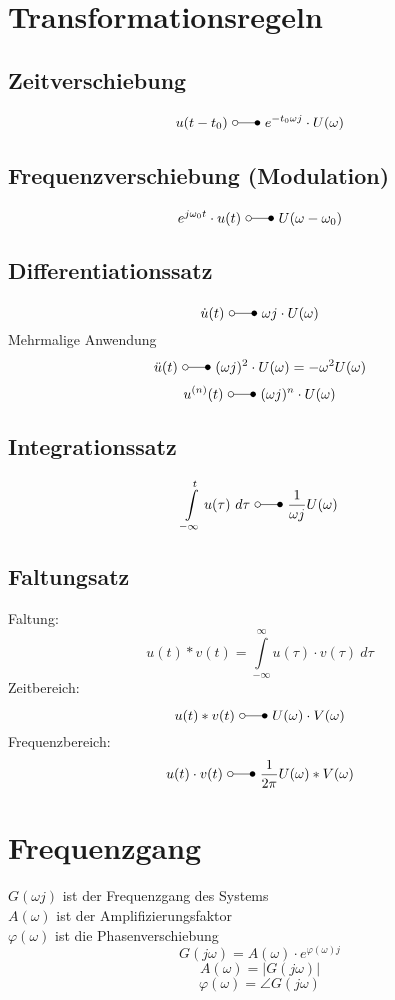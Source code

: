 \section{Transformationsregeln}

\subsection{Zeitverschiebung}
\[ u(t - t_0) ~ \laplace ~ e^{-t_0 \omega j} \cdot U(\omega) \]
\subsection{Frequenzverschiebung (Modulation)}
\[ e^{j\omega_0 t} \cdot u(t) ~\laplace ~U(\omega - \omega_0) \]
\subsection{Differentiationssatz}
\[ \dot{u}(t) ~ \laplace ~ \omega j \cdot U(\omega) \]
Mehrmalige Anwendung
\[ \ddot{u}(t) ~ \laplace ~ (\omega j)^2 \cdot U(\omega) = -\omega^2 U(\omega) \]
\[ u^{(n)}(t) ~ \laplace ~ (\omega j)^n \cdot U(\omega) \]


\subsection{Integrationssatz}
\[\int\limits_{-\infty}^{t} u(\tau) ~ d \tau ~\laplace ~ \frac{1}{\omega j} U(\omega) \]

\subsection{Faltungsatz}
Faltung: 
\[u(t) * v(t) = \int\limits_{-\infty}^{\infty} u(\tau) \cdot v(\tau) ~ d \tau  \]
Zeitbereich: 
\[ u(t) * v(t) ~ \laplace ~ U(\omega) \cdot V(\omega) \]
Frequenzbereich:
\[ u(t) \cdot v(t) ~ \laplace ~ \frac{1}{2 \pi} U(\omega) * V(\omega) \]

\section{Frequenzgang}

$G(\omega j)$ ist der Frequenzgang des Systems \\
$A(\omega) $ ist der Amplifizierungsfaktor\\
$\varphi(\omega) $ ist die Phasenverschiebung
\[ \boxed{G(j \omega) = A(\omega) \cdot e^{\varphi(\omega)j}}\]
\[ A(\omega) = |G(j\omega)| \]
\[ \varphi(\omega) = \angle G(j \omega) \]


